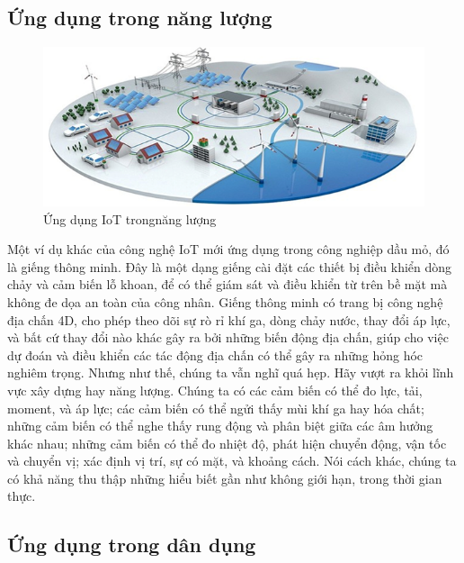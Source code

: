 \subsection*{Ứng dụng trong năng lượng }

\begin{figure}[htbp!] 
\centering    
\includegraphics[width=1\textwidth]{pic9}
\caption[Ứng dụng IoT trong năng lượng]{Ứng dụng IoT trongnăng lượng}
\label{fig:pic9}
\end{figure}
Một ví dụ khác của công nghệ IoT mới ứng dụng trong công nghiệp dầu mỏ, đó là giếng thông minh. Đây là một dạng giếng cài đặt các thiết bị điều khiển dòng chảy và cảm biến lỗ khoan, để có thể giám sát và điều khiển từ trên bề mặt mà không đe dọa an toàn của công nhân. Giếng thông minh có trang bị công nghệ địa chấn 4D, cho phép theo dõi sự rò rỉ khí ga, dòng chảy nước, thay đổi áp lực, và bất cứ thay đổi nào khác gây ra bởi những biến động địa chấn, giúp cho việc dự đoán và điều khiển các tác động địa chấn có thể gây ra những hỏng hóc nghiêm trọng.
Nhưng như thế, chúng ta vẫn nghĩ quá hẹp. Hãy vượt ra khỏi lĩnh vực xây dựng hay năng lượng. Chúng ta có các cảm biến có thể đo lực, tải, moment, và áp lực; các cảm biến có thể ngửi thấy mùi khí ga hay hóa chất; những cảm biến có thể nghe thấy rung động và phân biệt giữa các âm hưởng khác nhau; những cảm biến có thể đo nhiệt độ, phát hiện chuyển động, vận tốc và chuyển vị; xác định vị trí, sự có mặt, và khoảng cách. Nói cách khác, chúng ta có khả năng thu thập những hiểu biết gần như không giới hạn, trong thời gian thực.

\subsection*{Ứng dụng trong dân dụng  }

